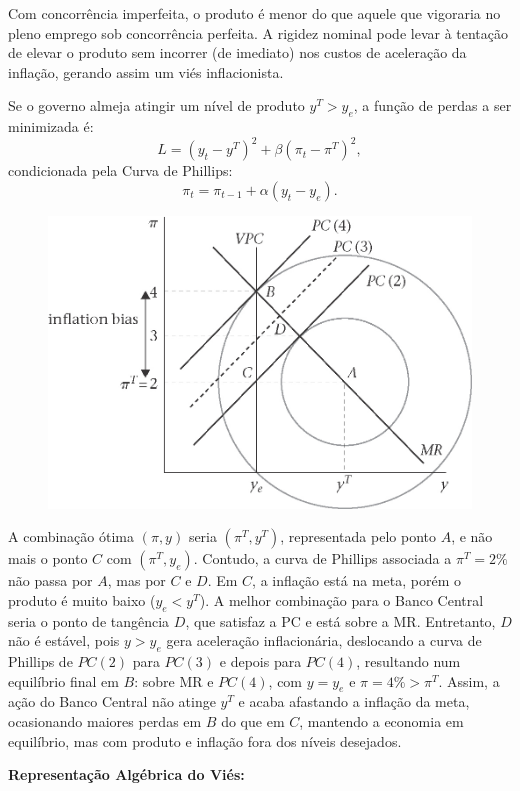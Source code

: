 \documentclass[a4paper,12pt]{article}[abntex2]
\begin{document}
Com concorrência imperfeita, o produto é menor do que aquele que vigoraria no pleno emprego sob concorrência perfeita. A rigidez nominal pode levar à tentação de elevar o produto sem incorrer (de imediato) nos custos de aceleração da inflação, gerando assim um viés inflacionista.

Se o governo almeja atingir um nível de produto $y^T > y_e$, a função de perdas a ser minimizada é:
\[
L = (y_t - y^T)^2 + \beta (\pi_t - \pi^T)^2,
\]
condicionada pela Curva de Phillips:
\[
\pi_t = \pi_{t-1} + \alpha (y_t - y_e).
\]

\begin{figure}[H]
    \centering
    \includegraphics[width=0.7\linewidth]{Imagens/a17i2.png}
\end{figure}

A combinação ótima $(\pi,y)$ seria $(\pi^T, y^T)$, representada pelo ponto $A$, e não mais o ponto $C$ com $(\pi^T, y_e)$. Contudo, a curva de Phillips associada a $\pi^T = 2\%$ não passa por $A$, mas por $C$ e $D$. Em $C$, a inflação está na meta, porém o produto é muito baixo ($y_e < y^T$). A melhor combinação para o Banco Central seria o ponto de tangência $D$, que satisfaz a PC e está sobre a MR. Entretanto, $D$ não é estável, pois $y > y_e$ gera aceleração inflacionária, deslocando a curva de Phillips de $PC(2)$ para $PC(3)$ e depois para $PC(4)$, resultando num equilíbrio final em $B$: sobre MR e $PC(4)$, com $y = y_e$ e $\pi = 4\% > \pi^T$. Assim, a ação do Banco Central não atinge $y^T$ e acaba afastando a inflação da meta, ocasionando maiores perdas em $B$ do que em $C$, mantendo a economia em equilíbrio, mas com produto e inflação fora dos níveis desejados.

\textbf{Representação Algébrica do Viés:}
\end{document}
